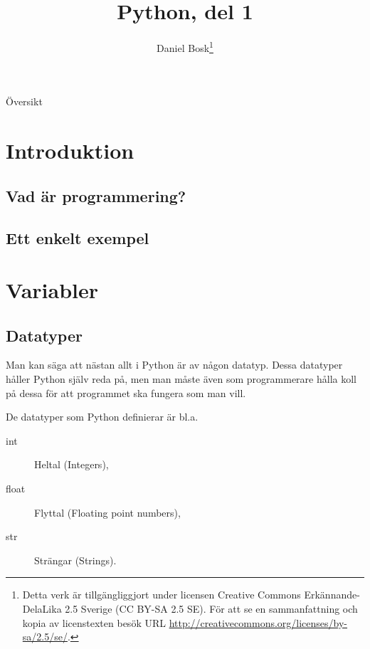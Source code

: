 \documentclass{beamer}
\title{%
  Python, del 1
}
\author{Daniel Bosk\footnote{%
  \tiny
  Detta verk är tillgängliggjort under licensen Creative Commons 
  Erkännande-DelaLika 2.5 Sverige (CC BY-SA 2.5 SE).
  För att se en sammanfattning och kopia av licenstexten besök URL 
  \url{http://creativecommons.org/licenses/by-sa/2.5/se/}.
}}
\institute[MIUN IKS]{%
  Avdelningen för informations- och kommunikationssytem (IKS),\\
  Mittuniversitetet, Sundsvall.
}
\date{\svnId}
\begin{document}
\begin{frame}
  \titlepage
\end{frame}

\begin{frame}{Översikt}
  \tableofcontents
\end{frame}

%  





\section{Introduktion}

\subsection{Vad är programmering?}

\begin{frame}{\insertsubsectionhead}
\end{frame}

\subsection{Ett enkelt exempel}

\begin{frame}{\insertsubsectionhead}
\end{frame}


\section{Variabler}

\subsection{Datatyper}

\begin{frame}{\insertsubsectionhead}
  Man kan säga att nästan allt i Python är av någon datatyp. Dessa datatyper
  håller Python själv reda på, men man måste även som programmerare hålla koll
  på dessa för att programmet ska fungera som man vill.

  De datatyper som Python definierar är bl.a.
  \begin{description}
    \item[int] Heltal (Integers),
    \item[float] Flyttal (Floating point numbers),
    \item[str] Strängar (Strings).
  \end{description}
\end{frame}
\end{document}
